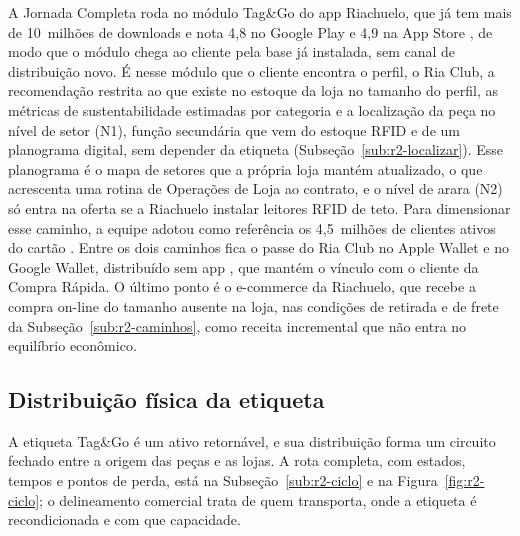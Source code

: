 A Jornada Completa roda no módulo Tag\&Go do app Riachuelo, que já tem mais de 10~milhões de downloads e nota 4,8 no Google Play e 4,9 na App Store \cite{googleplay2026riachuelo,appstore2026riachuelo}, de modo que o módulo chega ao cliente pela base já instalada, sem canal de distribuição novo. É nesse módulo que o cliente encontra o perfil, o Ria Club, a recomendação restrita ao que existe no estoque da loja no tamanho do perfil, as métricas de sustentabilidade estimadas por categoria e a localização da peça no nível de setor (N1), função secundária que vem do estoque RFID e de um planograma digital, sem depender da etiqueta (Subseção~\ref{sub:r2-localizar}). Esse planograma é o mapa de setores que a própria loja mantém atualizado, o que acrescenta uma rotina de Operações de Loja ao contrato, e o nível de arara (N2) só entra na oferta se a Riachuelo instalar leitores RFID de teto. Para dimensionar esse caminho, a equipe adotou como referência os 4,5~milhões de clientes ativos do cartão \cite{btg2025guararapes}. Entre os dois caminhos fica o passe do Ria Club no Apple Wallet e no Google Wallet, distribuído sem app \cite{apple2026walletpass,google2026walletfidelidade}, que mantém o vínculo com o cliente da Compra Rápida. O último ponto é o e-commerce da Riachuelo, que recebe a compra on-line do tamanho ausente na loja, nas condições de retirada e de frete da Subseção~\ref{sub:r2-caminhos}, como receita incremental que não entra no equilíbrio econômico.

\subsection{Distribuição física da etiqueta}
\label{sub:r2-distribuicao}

A etiqueta Tag\&Go é um ativo retornável, e sua distribuição forma um circuito fechado entre a origem das peças e as lojas. A rota completa, com estados, tempos e pontos de perda, está na Subseção~\ref{sub:r2-ciclo} e na Figura~\ref{fig:r2-ciclo}; o delineamento comercial trata de quem transporta, onde a etiqueta é recondicionada e com que capacidade.

